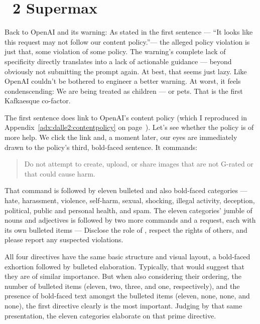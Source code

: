 
\section{\DALLE~2 Supermax}
\label{sec:dalle:supermax}

Back to OpenAI and its warning: As stated in the first sentence --- ``It looks
like this request may not follow our content policy.''--- the alleged policy
violation is just that, some violation of some policy. The warning's complete
lack of specificity directly translates into a lack of actionable guidance —
beyond obviously not submitting the prompt again. At best, that seems just lazy.
Like OpenAI couldn't be bothered to engineer a better warning. At worst, it
feels condenscending: We are being treated as children --- or pets. That is the
first Kafkaesque co-factor.

The first sentence does link to OpenAI's content policy (which I reproduced in
Appendix~\ref{adx:dalle2:contentpolicy} on
page~\pageref{adx:dalle2:contentpolicy}). Let's see whether the policy is of
more help. We click the link and, a moment later, our eyes are immediately drawn
to the policy's third, bold-faced sentence. It commands:

\begin{quote}
\openfatdquo{}Do not attempt to create, upload, or share images that are not
G-rated or that could cause harm.\closefatdquo{}
\end{quote}

\noindent{}That command is followed by eleven bulleted and also bold-faced
categories — hate, harassment, violence, self-harm, sexual, shocking, illegal
activity, deception, political, public and personal health, and spam. The eleven
categories' jumble of nouns and adjectives is followed by two more commands and
a request, each with its own bulleted items — Disclose the role of \AI, respect
the rights of others, and please report any suspected violations.

All four directives have the same basic structure and visual layout, a
bold-faced exhortion followed by bulleted elaboration. Typically, that would
suggest that they are of similar importance. But when also considering their
ordering, the number of bulleted items (eleven, two, three, and one,
respectively), and the presence of bold-faced text amongst the bulleted items
(eleven, none, none, and none), the first directive clearly is the most
important. Judging by that same presentation, the eleven categories elaborate on
that prime directive.


